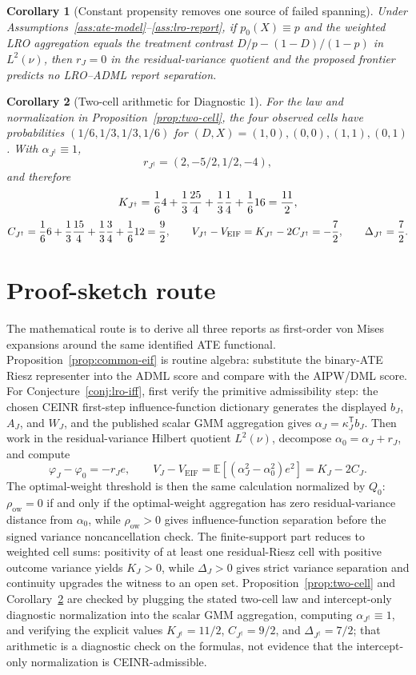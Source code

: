 \documentclass[11pt]{article}
\newcommand{\E}{\mathbb{E}}
\newcommand{\transpose}{\mathsf{T}}
\theoremstyle{definition}
\theoremstyle{plain}
\newtheorem{corollary}{Corollary}
\theoremstyle{remark}
\begin{document}
\begin{corollary}[Constant propensity removes one source of failed spanning]\label{cor:constant-propensity}
Under Assumptions~\ref{ass:ate-model}--\ref{ass:lro-report}, if $p_0(X)\equiv p$ and the weighted LRO aggregation equals the treatment contrast $D/p-(1-D)/(1-p)$ in $L^2(\nu)$, then $r_J=0$ in the residual-variance quotient and the proposed frontier predicts no LRO--ADML report separation.
\end{corollary}

\begin{corollary}[Two-cell arithmetic for Diagnostic 1]\label{cor:two-cell-arithmetic}
For the law and normalization in Proposition~\ref{prop:two-cell}, the four observed cells have probabilities $(1/6,1/3,1/3,1/6)$ for $(D,X)=(1,0),(0,0),(1,1),(0,1)$.  With $\alpha_{J^\dagger}\equiv1$,
\[
  r_{J^\dagger}=(2,-5/2,1/2,-4),
\]
and therefore
\[
  K_{J^\dagger}
  ={1\over6}4+{1\over3}{25\over4}+{1\over3}{1\over4}+{1\over6}16
  ={11\over2},
\]
\[
  C_{J^\dagger}
  ={1\over6}6+{1\over3}{15\over4}+{1\over3}{3\over4}+{1\over6}12
  ={9\over2},
  \qquad
  V_{J^\dagger}-V_{\mathrm{EIF}}=K_{J^\dagger}-2C_{J^\dagger}=-{7\over2},
  \qquad
  \Delta_{J^\dagger}={7\over2}.
\]
\end{corollary}

\section{Proof-sketch route}
The mathematical route is to derive all three reports as first-order von Mises expansions around the same identified ATE functional.  Proposition~\ref{prop:common-eif} is routine algebra: substitute the binary-ATE Riesz representer into the ADML score and compare with the AIPW/DML score.  For Conjecture~\ref{conj:lro-iff}, first verify the primitive admissibility step: the chosen CEINR first-step influence-function dictionary generates the displayed $b_J$, $A_J$, and $W_J$, and the published scalar GMM aggregation gives $\alpha_J=\kappa_J^\transpose b_J$.  Then work in the residual-variance Hilbert quotient $L^2(\nu)$, decompose $\alpha_0=\alpha_J+r_J$, and compute
\[
  \varphi_J-\varphi_0=-r_Je,\qquad
  V_J-V_{\mathrm{EIF}}=\E[(\alpha_J^2-\alpha_0^2)e^2]=K_J-2C_J.
\]
The optimal-weight threshold is then the same calculation normalized by $Q_0$: $\rho_{\mathrm{ow}}=0$ if and only if the optimal-weight aggregation has zero residual-variance distance from $\alpha_0$, while $\rho_{\mathrm{ow}}>0$ gives influence-function separation before the signed variance noncancellation check.  The finite-support part reduces to weighted cell sums: positivity of at least one residual-Riesz cell with positive outcome variance yields $K_J>0$, while $\Delta_J>0$ gives strict variance separation and continuity upgrades the witness to an open set.  Proposition~\ref{prop:two-cell} and Corollary~\ref{cor:two-cell-arithmetic} are checked by plugging the stated two-cell law and intercept-only diagnostic normalization into the scalar GMM aggregation, computing $\alpha_{J^\dagger}\equiv1$, and verifying the explicit values $K_{J^\dagger}=11/2$, $C_{J^\dagger}=9/2$, and $\Delta_{J^\dagger}=7/2$; that arithmetic is a diagnostic check on the formulas, not evidence that the intercept-only normalization is CEINR-admissible.
\end{document}
